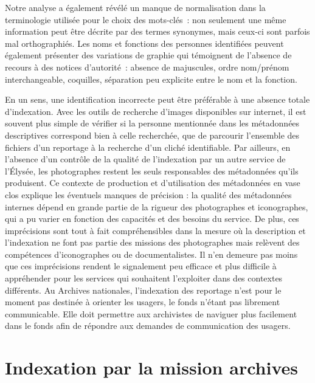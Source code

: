 Notre analyse a également révélé un manque de normalisation dans la terminologie utilisée pour le choix des mots-clés : non seulement une même information peut être décrite par des termes synonymes, mais ceux-ci sont parfois mal orthographiés. Les noms et fonctions des personnes identifiées peuvent également présenter des variations de graphie qui témoignent de l’absence de recours à des notices d’autorité : absence de majuscules, ordre nom/prénom interchangeable, coquilles, séparation peu explicite entre le nom et la fonction. 

En un sens, une identification incorrecte peut être préférable à une absence totale d’indexation. Avec les outils de recherche d’images disponibles sur internet, il est souvent plus simple de vérifier si la personne mentionnée dans les métadonnées descriptives correspond bien à celle recherchée, que de parcourir l’ensemble des fichiers d’un reportage à la recherche d’un cliché identifiable. Par ailleurs, en l’absence d’un contrôle de la qualité de l’indexation par un autre service de l’Élysée, les photographes restent les seuls responsables des métadonnées qu’ils produisent. Ce contexte de production et d’utilisation des métadonnées en vase clos explique les éventuels manques de précision : la qualité des métadonnées internes dépend en grande partie de la rigueur des photographes et iconographes, qui a pu varier en fonction des capacités et des besoins du service. De plus, ces imprécisions sont tout à fait compréhensibles dans la mesure où la description et l'indexation ne font pas partie des missions des photographes mais relèvent des compétences d'iconographes ou de documentalistes. Il n'en demeure pas moins que ces imprécisions rendent le signalement peu efficace et plus difficile à appréhender pour les services qui souhaitent l'exploiter dans des contextes différents. Au Archives nationales, l'indexation des reportage n'est pour le moment pas destinée à orienter les usagers, le fonds n'étant pas librement communicable. Elle doit permettre aux archivistes de naviguer plus facilement dans le fonds afin de répondre aux demandes de communication des usagers.

\section{Indexation par la mission archives}

